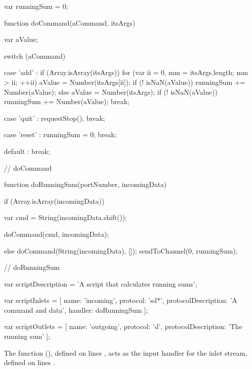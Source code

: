 \begin{listing}[5]{1}
var runningSum = 0;

function doCommand(aCommand, itsArgs)
{
    var aValue;
    
    switch (aCommand)
    {
        case 'add' :
            if (Array.isArray(itsArgs))
            {
                for (var ii = 0, mm = itsArgs.length; mm > ii; ++ii)
                {
                    aValue = Number(itsArgs[ii]);
                    if (! isNaN(aValue))
                    {
                        runningSum += Number(aValue);
                    }
                }
            }
            else
            {
                aValue = Number(itsArgs);
                if (! isNaN(aValue))
                {
                    runningSum += Number(aValue);
                }
            }
            break;
            
        case 'quit' :
            requestStop();
            break;
            
        case 'reset' :
            runningSum = 0;
            break;
            
        default :
            break;
            
    }
} // doCommand

function doRunningSum(portNumber, incomingData)
{
    if (Array.isArray(incomingData))
    {
        var cmd = String(incomingData.shift());
        
        doCommand(cmd, incomingData);
    }
    else
    {
        doCommand(String(incomingData), []);
    }
    sendToChannel(0, runningSum);
} // doRunningSum

var scriptDescription = 'A script that calculates running sums';

var scriptInlets = [ { name: 'incoming', protocol: 'sd*',
                        protocolDescription: 'A command and data',
                        handler: doRunningSum } ];

var scriptOutlets = [ { name: 'outgoing', protocol: 'd',
                        protocolDescription: 'The running sum' } ];
\end{listing}
\codeEnd{}
The function (), defined on lines \longDash{},
acts as the input handler for the inlet stream, defined on lines
\longDash{}.\\

